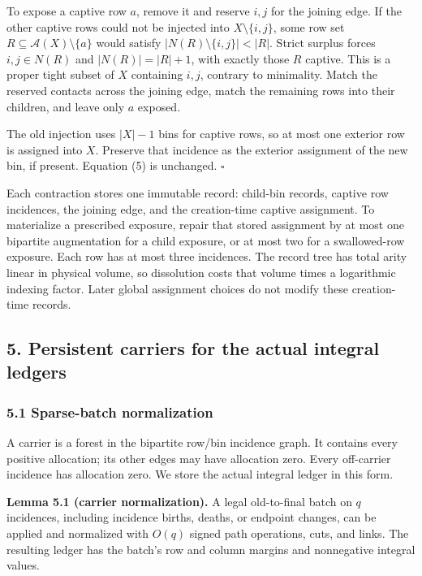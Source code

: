 To expose a captive row \(a\), remove it and reserve \(i,j\) for the joining edge. If the other captive rows could not be injected into \(X\setminus\{i,j\}\), some row set \(R\subseteq\mathcal A(X)\setminus\{a\}\) would satisfy \(|N(R)\setminus\{i,j\}|<|R|\). Strict surplus forces \(i,j\in N(R)\) and \(|N(R)|=|R|+1\), with exactly those \(R\) captive. This is a proper tight subset of \(X\) containing \(i,j\), contrary to minimality. Match the reserved contacts across the joining edge, match the remaining rows into their children, and leave only \(a\) exposed.

The old injection uses \(|X|-1\) bins for captive rows, so at most one exterior row is assigned into \(X\). Preserve that incidence as the exterior assignment of the new bin, if present. Equation (5) is unchanged. \hfill\(\square\)

Each contraction stores one immutable record: child-bin records, captive row incidences, the joining edge, and the creation-time captive assignment. To materialize a prescribed exposure, repair that stored assignment by at most one bipartite augmentation for a child exposure, or at most two for a swallowed-row exposure. Each row has at most three incidences. The record tree has total arity linear in physical volume, so dissolution costs that volume times a logarithmic indexing factor. Later global assignment choices do not modify these creation-time records.

\hypertarget{af-46593eb93e-persistent-carriers-for-the-actual-integral-ledgers}{%
\subsection{5. Persistent carriers for the actual integral ledgers}\label{af-46593eb93e-persistent-carriers-for-the-actual-integral-ledgers}}

\hypertarget{af-46593eb93e-sparse-batch-normalization}{%
\subsubsection{5.1 Sparse-batch normalization}\label{af-46593eb93e-sparse-batch-normalization}}

A carrier is a forest in the bipartite row/bin incidence graph. It contains every positive allocation; its other edges may have allocation zero. Every off-carrier incidence has allocation zero. We store the actual integral ledger in this form.

\textbf{Lemma 5.1 (carrier normalization).} A legal old-to-final batch on \(q\) incidences, including incidence births, deaths, or endpoint changes, can be applied and normalized with \(O(q)\) signed path operations, cuts, and links. The resulting ledger has the batch's row and column margins and nonnegative integral values.

